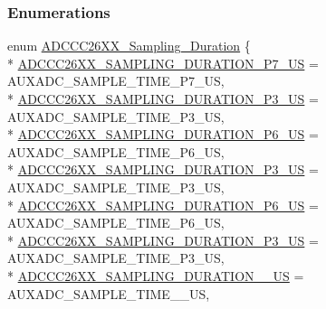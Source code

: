 \subsubsection*{Enumerations}
\begin{DoxyCompactItemize}
\item 
enum \hyperlink{_a_d_c_c_c26_x_x_8h_adb3cf48cf9cac58a07ade90966bdb8f1}{A\+D\+C\+C\+C26\+X\+X\+\_\+\+Sampling\+\_\+\+Duration} \{ \\*
\hyperlink{_a_d_c_c_c26_x_x_8h_adb3cf48cf9cac58a07ade90966bdb8f1aba2a098b9bcf13ffe3dc3c5ef69c5452}{A\+D\+C\+C\+C26\+X\+X\+\_\+\+S\+A\+M\+P\+L\+I\+N\+G\+\_\+\+D\+U\+R\+A\+T\+I\+O\+N\+\_\+P7\+\_\+\+U\+S} = A\+U\+X\+A\+D\+C\+\_\+\+S\+A\+M\+P\+L\+E\+\_\+\+T\+I\+M\+E\+\_\+P7\+\_\+\+U\+S, 
\\*
\hyperlink{_a_d_c_c_c26_x_x_8h_adb3cf48cf9cac58a07ade90966bdb8f1a9827d7266c7e2f27fad6bddbf30a71a3}{A\+D\+C\+C\+C26\+X\+X\+\_\+\+S\+A\+M\+P\+L\+I\+N\+G\+\_\+\+D\+U\+R\+A\+T\+I\+O\+N\+\_\+P3\+\_\+\+U\+S} = A\+U\+X\+A\+D\+C\+\_\+\+S\+A\+M\+P\+L\+E\+\_\+\+T\+I\+M\+E\+\_\+P3\+\_\+\+U\+S, 
\\*
\hyperlink{_a_d_c_c_c26_x_x_8h_adb3cf48cf9cac58a07ade90966bdb8f1a250013498c4ab0a0b1dbfd950a107d75}{A\+D\+C\+C\+C26\+X\+X\+\_\+\+S\+A\+M\+P\+L\+I\+N\+G\+\_\+\+D\+U\+R\+A\+T\+I\+O\+N\+\_\+P6\+\_\+\+U\+S} = A\+U\+X\+A\+D\+C\+\_\+\+S\+A\+M\+P\+L\+E\+\_\+\+T\+I\+M\+E\+\_\+P6\+\_\+\+U\+S, 
\\*
\hyperlink{_a_d_c_c_c26_x_x_8h_adb3cf48cf9cac58a07ade90966bdb8f1a4d2a5b63503209857e898330299c1f87}{A\+D\+C\+C\+C26\+X\+X\+\_\+\+S\+A\+M\+P\+L\+I\+N\+G\+\_\+\+D\+U\+R\+A\+T\+I\+O\+N\+\_\+P3\+\_\+\+U\+S} = A\+U\+X\+A\+D\+C\+\_\+\+S\+A\+M\+P\+L\+E\+\_\+\+T\+I\+M\+E\+\_\+P3\+\_\+\+U\+S, 
\\*
\hyperlink{_a_d_c_c_c26_x_x_8h_adb3cf48cf9cac58a07ade90966bdb8f1a27254a92037a20001aaa223facd1bc59}{A\+D\+C\+C\+C26\+X\+X\+\_\+\+S\+A\+M\+P\+L\+I\+N\+G\+\_\+\+D\+U\+R\+A\+T\+I\+O\+N\+\_\+P6\+\_\+\+U\+S} = A\+U\+X\+A\+D\+C\+\_\+\+S\+A\+M\+P\+L\+E\+\_\+\+T\+I\+M\+E\+\_\+P6\+\_\+\+U\+S, 
\\*
\hyperlink{_a_d_c_c_c26_x_x_8h_adb3cf48cf9cac58a07ade90966bdb8f1a476cb15ad1d204ad35b8e69a396dc476}{A\+D\+C\+C\+C26\+X\+X\+\_\+\+S\+A\+M\+P\+L\+I\+N\+G\+\_\+\+D\+U\+R\+A\+T\+I\+O\+N\+\_\+P3\+\_\+\+U\+S} = A\+U\+X\+A\+D\+C\+\_\+\+S\+A\+M\+P\+L\+E\+\_\+\+T\+I\+M\+E\+\_\+P3\+\_\+\+U\+S, 
\\*
\hyperlink{_a_d_c_c_c26_x_x_8h_adb3cf48cf9cac58a07ade90966bdb8f1a84388397aab7566b272db3b0365e427c}{A\+D\+C\+C\+C26\+X\+X\+\_\+\+S\+A\+M\+P\+L\+I\+N\+G\+\_\+\+D\+U\+R\+A\+T\+I\+O\+N\+\_\+\_\+\+U\+S} = A\+U\+X\+A\+D\+C\+\_\+\+S\+A\+M\+P\+L\+E\+\_\+\+T\+I\+M\+E\+\_\+\_\+\+U\+S, 

\end{DoxyCompactItemize}

